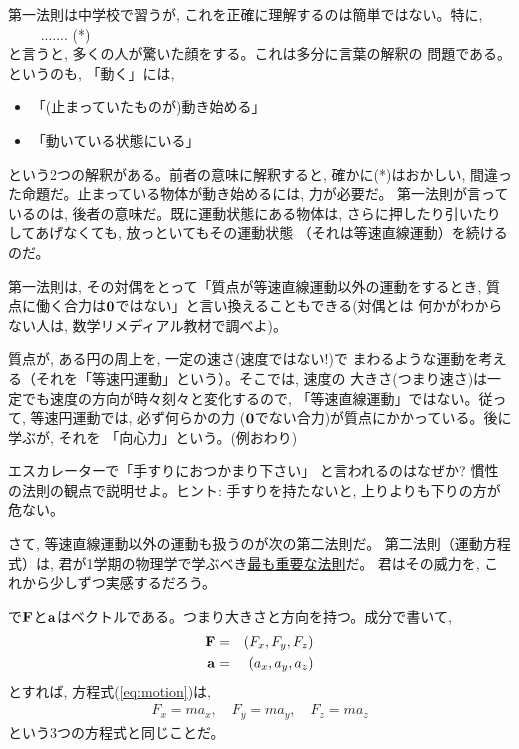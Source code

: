 第一法則は中学校で習うが, これを正確に理解するのは簡単ではない。特に, \\
　　 ....... (*)\\
と言うと, 多くの人が驚いた顔をする。これは多分に言葉の解釈の
問題である。というのも, 「動く」には, 
\begin{itemize}
\item 「(止まっていたものが)動き始める」
\item 「動いている状態にいる」
\end{itemize}
という2つの解釈がある。前者の意味に解釈すると, 確かに(*)はおかしい, 
間違った命題だ。止まっている物体が動き始めるには, 力が必要だ。
第一法則が言っているのは, 後者の意味だ。既に運動状態にある物体は, 
さらに押したり引いたりしてあげなくても, 放っといてもその運動状態
（それは等速直線運動）を続けるのだ。\mv

第一法則は, その対偶をとって「質点が等速直線運動以外の運動をするとき, 
質点に働く合力は${\bf 0}$ではない」と言い換えることもできる(対偶とは
何かがわからない人は, 数学リメディアル教材で調べよ)。

\begin{exmpl} 質点が, ある円の周上を, 一定の速さ(速度ではない!)で
まわるような運動を考える（それを「等速円運動」という）。そこでは, 速度の
大きさ(つまり速さ)は一定でも速度の方向が時々刻々と変化するので, 
「等速直線運動」ではない。従って, 等速円運動では, 必ず何らかの力
(${\bf 0}$でない合力)が質点にかかっている。後に学ぶが, それを
「向心力」という。(例おわり)\end{exmpl}

\begin{q}\label{q:escalator} エスカレーターで「手すりにおつかまり下さい」
と言われるのはなぜか? 慣性の法則の観点で説明せよ。ヒント: 手すりを持たないと, 
上りよりも下りの方が危ない。\end{q}\mv

さて, 等速直線運動以外の運動も扱うのが次の第二法則だ。
第二法則（運動方程式）は, 君が1学期の物理学で学ぶべき\underline{最も重要な法則}だ。
君はその威力を, これから少しずつ実感するだろう。

で${\bf F}$と${\bf a}$はベクトルである。つまり大きさと方向を持つ。成分で書いて, 
\begin{eqnarray}
{\bf F}&=&(F_x, F_y, F_z)\\
{\bf a}&=&(a_x, a_y, a_z)
\end{eqnarray}
とすれば, 方程式(\ref{eq:motion})は, 
\begin{eqnarray}
F_x=ma_x,\quad
F_y=ma_y, \quad
F_z=ma_z
\end{eqnarray}
という3つの方程式と同じことだ。

